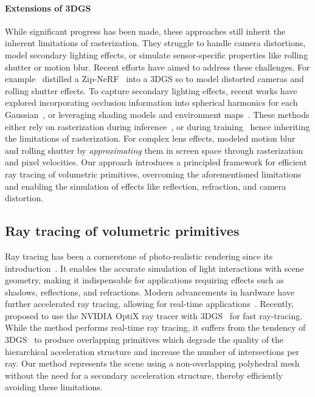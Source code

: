 \paragraph{Extensions of 3DGS}
While significant progress has been made, these approaches still inherit the inherent limitations of rasterization. 
They struggle to handle camera distortions, model secondary lighting effects, or simulate sensor-specific properties like rolling shutter or motion blur. 
Recent efforts have aimed to address these challenges.
For example~\citet{radsplat} distilled a Zip-NeRF~\cite{zipnerf} into a 3DGS so to model distorted cameras and rolling shutter effects.
% 
To capture secondary lighting effects, recent works have explored incorporating occlusion information into spherical harmonics for each Gaussian~\cite{relightable-3dgs, gs-ir}, or leveraging shading models and environment maps~\cite{gaussianshader}. 
These methods either rely on rasterization during inference~\cite{relightable-3dgs}, or during training~\cite{gs-ir, gaussianshader} hence inheriting the limitations of rasterization.
For complex lens effects, \citet{3dgs-on-the-move} modeled motion blur and rolling shutter by \textit{approximating} them in screen space through rasterization and pixel velocities.
\quad
Our approach introduces a principled framework for efficient ray tracing of volumetric primitives, overcoming the aforementioned limitations and enabling the simulation of effects like reflection, refraction, and camera distortion.



\subsection{Ray tracing of volumetric primitives}
Ray tracing has been a cornerstone of photo-realistic rendering since its introduction~\cite{illumination-model}.
It enables the accurate simulation of light interactions with scene geometry, making it indispensable for applications requiring effects such as shadows, reflections, and refractions. 
Modern advancements in hardware have further accelerated ray tracing, allowing for real-time applications~\cite{harmonic-coordinates}.
Recently, \citet{3dgrt} proposed to use the NVIDIA OptiX ray tracer with 3DGS~\cite{gsplat} for fast ray-tracing.
While the method performs real-time ray tracing, it suffers from the tendency of 3DGS~\cite{gsplat} to produce overlapping primitives which degrade the quality of the hierarchical acceleration structure and increase the number of intersections per ray.
\quad
Our method represents the scene using a non-overlapping polyhedral mesh without the need for a secondary acceleration structure, thereby efficiently avoiding these limitations.

